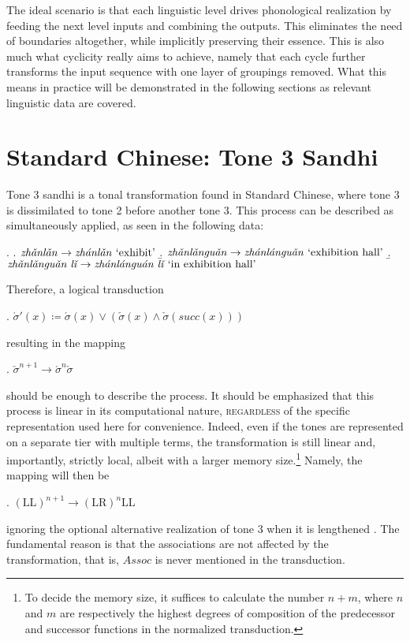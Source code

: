 \documentclass[12pt, a4paper]{report}
\newcommand{\textemph}[1]{\textsc{#1}}
\newcommand{\textform}[1]{\textit{#1}}
\newcommand{\textgls}[1]{`#1'}
\begin{document}
The ideal scenario is that each linguistic level drives phonological
realization by feeding the next level inputs and combining the
outputs.  This eliminates the need of boundaries altogether, while
implicitly preserving their essence.  This is also much what cyclicity
really aims to achieve, namely that each cycle further transforms the
input sequence with one layer of groupings removed.  What this means
in practice will be demonstrated in the following sections as relevant
linguistic data are covered.

\section{Standard Chinese: Tone 3 Sandhi}
Tone 3 sandhi is a tonal transformation found in Standard Chinese,
where tone 3 is dissimilated to tone 2 before another tone 3.  This
process can be described as simultaneously applied, as seen in the
following data:

\ex.
\a. \(\text{\textform{zhǎnlǎn}} \to
\text{\textform{zhánlǎn} \textgls{exhibit}}\)
\b. \(\text{\textform{zhǎnlǎnguǎn}} \to
\text{\textform{zhánlánguǎn} \textgls{exhibition hall}}\)
\b. \(\text{\textform{zhǎnlǎnguǎn lǐ}} \to
\text{\textform{zhánlánguán lǐ} \textgls{in exhibition hall}}\)

Therefore, a logical transduction

\ex. \(\acute{\sigma}'(x) \coloneq \acute{\sigma}(x) \lor
(\check{\sigma}(x) \land \check{\sigma}(\mathit{succ}(x)))\)

resulting in the mapping

\ex. \(\check{\sigma}^{n+1} \to \acute{\sigma}^{n}\check{\sigma}\)

should be enough to describe the process.  It should be emphasized
that this process is linear in its computational nature,
\textemph{regardless} of the specific representation used here for
convenience.  Indeed, even if the tones are represented on a separate
tier with multiple terms, the transformation is still linear and,
importantly, strictly local, albeit with a larger memory
size.\footnote{To decide the memory size, it suffices to calculate the
  number \(n + m\), where \(n\) and \(m\) are respectively the highest
  degrees of composition of the predecessor and successor functions in
  the normalized transduction.}  Namely, the mapping will then be

\ex. \((\text{LL})^{n+1} \to (\text{LR})^{n}\text{LL}\)

ignoring the optional alternative realization of tone 3 when it is
lengthened \parencite{d99mstems}.  The fundamental reason is that the
associations are not affected by the transformation, that is,
\(\mathit{Assoc}\) is never mentioned in the transduction.
\end{document}
